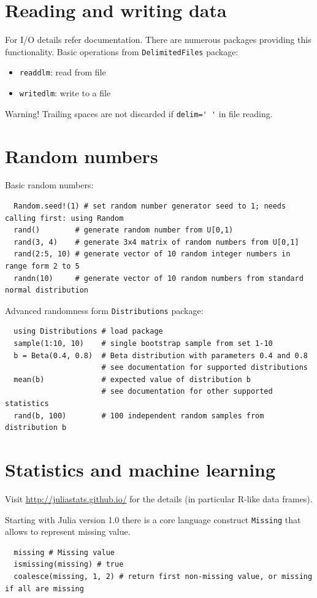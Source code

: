 \documentclass[10pt,a4paper]{article}
\begin{document}
\section{Reading and writing data}
For I/O details refer documentation. There are numerous packages providing this functionality.
Basic operations from \lstinline|DelimitedFiles| package:
\begin{itemize}
  \item \lstinline|readdlm|: read from file
  \item \lstinline|writedlm|: write to a file
\end{itemize}

Warning! Trailing spaces are not discarded if \lstinline|delim=' '| in file reading.

\section{Random numbers}
Basic random numbers:
\begin{lstlisting}
  Random.seed!(1) # set random number generator seed to 1; needs calling first: using Random
  rand()        # generate random number from U[0,1)
  rand(3, 4)    # generate 3x4 matrix of random numbers from U[0,1]
  rand(2:5, 10) # generate vector of 10 random integer numbers in range form 2 to 5
  randn(10)     # generate vector of 10 random numbers from standard normal distribution
\end{lstlisting}

Advanced randomness form \lstinline|Distributions| package:
\begin{lstlisting}
  using Distributions # load package
  sample(1:10, 10)    # single bootstrap sample from set 1-10
  b = Beta(0.4, 0.8)  # Beta distribution with parameters 0.4 and 0.8
                      # see documentation for supported distributions
  mean(b)             # expected value of distribution b
                      # see documentation for other supported statistics
  rand(b, 100)        # 100 independent random samples from distribution b
\end{lstlisting}

\section{Statistics and machine learning}
Visit \url{http://juliastats.github.io/} for the details (in particular R-like data frames).

Starting with Julia version 1.0 there is a core language construct \lstinline|Missing| that allows to represent missing value.
\begin{lstlisting}
  missing # Missing value
  ismissing(missing) # true
  coalesce(missing, 1, 2) # return first non-missing value, or missing if all are missing
\end{lstlisting}
\end{document}
